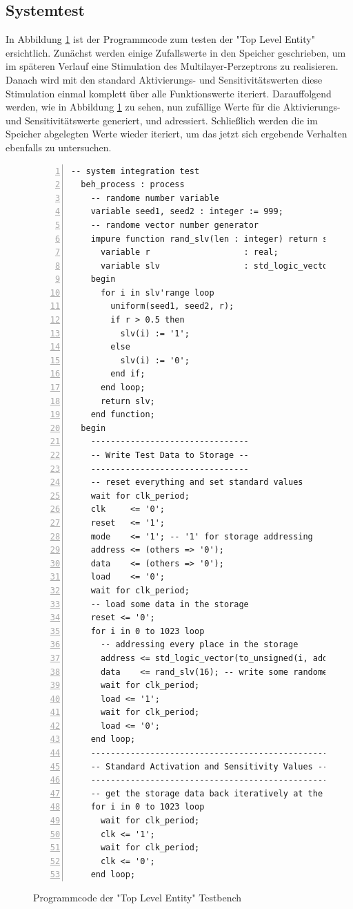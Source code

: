 \documentclass{article}
\numberwithin{equation}{section}
\begin{document}
\subsection{Systemtest}
In Abbildung \ref{code:top_level_entity_testbench1} ist der Programmcode zum testen der
"Top Level Entity" ersichtlich. Zunächst werden einige Zufallswerte in den Speicher
geschrieben, um im späteren Verlauf eine Stimulation des Multilayer-Perzeptrons 
zu realisieren. Danach wird mit den standard Aktivierungs- und Sensitivitätswerten
diese Stimulation einmal komplett über alle Funktionswerte iteriert. Darauffolgend
werden, wie in Abbildung \ref{code:top_level_entity_testbench1} zu sehen, nun zufällige 
Werte für die Aktivierungs- und Sensitivitätswerte generiert, und adressiert. 
Schließlich werden die im Speicher abgelegten Werte wieder iteriert, um das jetzt sich 
ergebende Verhalten ebenfalls zu untersuchen.
\begin{figure}[htbp]
\begin{lstlisting}[style=VHDL,numbers=left,stepnumber=1,style=myCustomMatlabStyle,basicstyle=\footnotesize]
-- system integration test
  beh_process : process
    -- randome number variable
    variable seed1, seed2 : integer := 999;
    -- randome vector number generator
    impure function rand_slv(len : integer) return std_logic_vector is
      variable r                   : real;
      variable slv                 : std_logic_vector(len - 1 downto 0);
    begin
      for i in slv'range loop
        uniform(seed1, seed2, r);
        if r > 0.5 then
          slv(i) := '1';
        else
          slv(i) := '0';
        end if;
      end loop;
      return slv;
    end function;
  begin
    --------------------------------
    -- Write Test Data to Storage --
    --------------------------------
    -- reset everything and set standard values
    wait for clk_period;
    clk     <= '0';
    reset   <= '1';
    mode    <= '1'; -- '1' for storage addressing
    address <= (others => '0');
    data    <= (others => '0');
    load    <= '0';
    wait for clk_period;
    -- load some data in the storage
    reset <= '0';
    for i in 0 to 1023 loop
      -- addressing every place in the storage
      address <= std_logic_vector(to_unsigned(i, address'length));
      data    <= rand_slv(16); -- write some randome data in the storage
      wait for clk_period;
      load <= '1';
      wait for clk_period;
      load <= '0';
    end loop;
    ------------------------------------------------
    -- Standard Activation and Sensitivity Values --
    ------------------------------------------------
    -- get the storage data back iteratively at the output port
    for i in 0 to 1023 loop
      wait for clk_period;
      clk <= '1';
      wait for clk_period;
      clk <= '0';
    end loop;
\end{lstlisting}
\caption{Programmcode der "Top Level Entity" Testbench} \label{code:top_level_entity_testbench1}
\end{figure}
\end{document}
